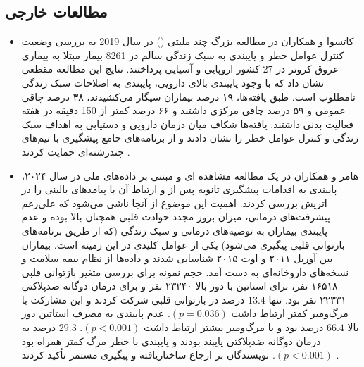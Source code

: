 \subsection{مطالعات خارجی}


\begin{itemize}
\item کاتسوا و همکاران در مطالعه بزرگ چند ملیتی () در سال 2019 به بررسی وضعیت کنترل عوامل خطر و پایبندی به سبک زندگی  سالم در 8261 بیمار مبتلا به بیماری عروق کرونر در 27 کشور اروپایی و آسیایی پرداختند. نتایج این مطالعه مقطعی نشان داد که با وجود پایبندی بالای دارویی، پایبندی به اصلاحات سبک زندگی نامطلوب است. طبق یافته‌ها،  ۱۹ درصد بیماران سیگار می‌کشیدند، ۳۸ درصد چاقی عمومی و ۵۹ درصد چاقی مرکزی داشتند و ۶۶ درصد کمتر از 150 دقیقه در هفته فعالیت بدنی داشتند. یافته‌ها شکاف میان درمان دارویی و دستیابی به اهداف سبک زندگی و  کنترل عوامل خطر را نشان دادند و از برنامه‌های جامع پیشگیری با تیم‌های چندرشته‌ای حمایت کردند \cite{Kotseva2019EUROASPIRE}.

\item هامر و همکاران در یک مطالعه مشاهده ای و مبتنی بر داده‌های ملی در سال ۲۰۲۴، پایبندی به اقدامات پیشگیری ثانویه پس از  و ارتباط آن با پیامدهای بالینی را در اتریش بررسی کردند. اهمیت این موضوع از آنجا ناشی می‌شود که علی‌رغم پیشرفت‌های درمانی، میزان بروز مجدد حوادث قلبی همچنان بالا بوده و عدم پایبندی بیماران به توصیه‌های درمانی و سبک زندگی (که از طریق برنامه‌های بازتوانی قلبی پیگیری می‌شود) یکی از عوامل کلیدی در این زمینه است. بیماران بین آوریل ۲۰۱۱ و اوت ۲۰۱۵ شناسایی شدند و داده‌ها از نظام بیمه سلامت و نسخه‌های داروخانه‌ای به دست آمد. حجم نمونه برای  بررسی متغیر بازتوانی قلبی ۱۶۵۱۸ نفر، برای استاتین با دوز بالا ۲۳۲۴۰ نفر و برای درمان دوگانه ضدپلاکتی ۲۲۳۳۱ نفر بود. تنها $13.4$ درصد در بازتوانی قلبی شرکت کردند و این مشارکت با مرگ‌ومیر کمتر ارتباط داشت $(p=0.036)$. عدم پایبندی به مصرف استاتین دوز بالا $66.4$ درصد بود و با مرگ‌ومیر بیشتر ارتباط داشت $(p<0.001)$. $29.3$ درصد به درمان دوگانه ضدپلاکتی پایبند بودند و پایبندی با خطر مرگ کمتر همراه بود $(p<0.001)$. نویسندگان بر ارجاع ساختاریافته و پیگیری مستمر تأکید کردند \cite{Hammer2024Adherence}.


\end{itemize}
